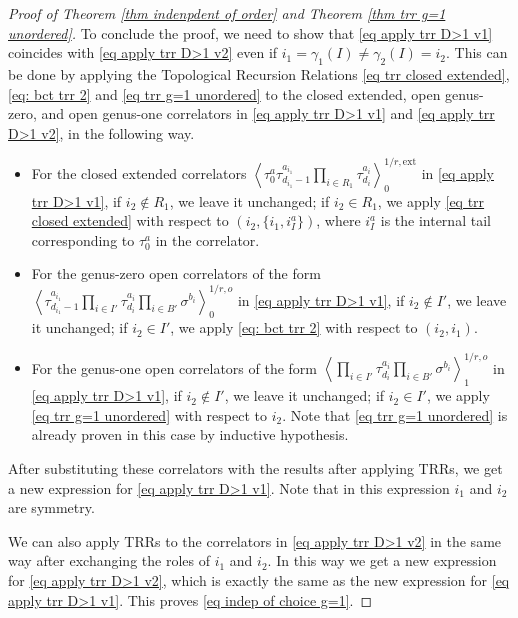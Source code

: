 \documentclass[11pt]{amsart}
\theoremstyle{definition}
\theoremstyle{remark}
\newcommand{\<}{\left<}
\renewcommand{\>}{\right>}
\numberwithin{equation}{section}
\begin{document}
\begin{proof}[Proof of Theorem \ref{thm indenpdent of order} and Theorem \ref{thm trr g=1 unordered}]
    To conclude the proof, we need to show that \eqref{eq apply trr D>1 v1} coincides with \eqref{eq apply trr D>1 v2} even if $i_1=\gamma_1(I)\ne \gamma_2(I) = i_2$. This can be done by applying the Topological Recursion Relations \eqref{eq trr closed extended}, \eqref{eq: bct trr 2} and \eqref{eq trr g=1 unordered} to the closed extended, open genus-zero, and open genus-one correlators in  \eqref{eq apply trr D>1 v1} and \eqref{eq apply trr D>1 v2}, in the following way. 
    \begin{itemize}
        \item[-] For the closed extended correlators $\left\langle \tau_0^{a}\tau_{d_{i_1}-1}^{a_{i_1}}\prod_{i \in R_1}\tau_{d_i}^{a_i}\right\rangle^{1/r,\text{ext}}_0$ in \eqref{eq apply trr D>1 v1}, if $i_2\notin R_1$, we leave it unchanged; if $i_2\in R_1$, we apply \eqref{eq trr closed extended} with respect to $(i_2,\{i_1,i_I^a\})$, where $i_I^a$ is the internal tail corresponding to $\tau_0^a$ in the correlator.
        \item[-] For the genus-zero open correlators of the %
form $\left\langle \tau_{d_{i_1}-1}^{a_{i_1}}\prod_{i \in I'}\tau_{d_i}^{a_i} \prod_{i\in B'}\sigma^{b_i}\right\rangle^{1/r,o}_0$ in %
\eqref{eq apply trr D>1 v1}, if $i_2\notin I'$, we leave it unchanged; if $i_2\in I'$, we apply \eqref{eq: bct trr 2} with respect to $(i_2,i_1)$.
        \item[-] For the genus-one open correlators of the %
form $\left\langle \prod_{i \in I'}\tau_{d_i}^{a_i} \prod_{i\in B'}\sigma^{b_i}\right\rangle^{1/r,o}_1$ in %
\eqref{eq apply trr D>1 v1}, if $i_2\notin I'$, we leave it unchanged; if $i_2\in I'$, we apply \eqref{eq trr g=1 unordered} with respect to $i_2$. Note that \eqref{eq trr g=1 unordered} is already proven in this case by inductive hypothesis. 
    \end{itemize}

    After substituting these correlators with the results after applying TRRs, we get a new expression for \eqref{eq apply trr D>1 v1}. Note that in this expression $i_1$ and $i_2$ are symmetry.

    We can also apply TRRs to the correlators in \eqref{eq apply trr D>1 v2} in the same way after exchanging the roles of $i_1$ and $i_2$. In this way we get a new expression for \eqref{eq apply trr D>1 v2}, which is exactly the same as the new expression for \eqref{eq apply trr D>1 v1}. This %
proves \eqref{eq indep of choice g=1}.

    
\end{proof}
\end{document}
